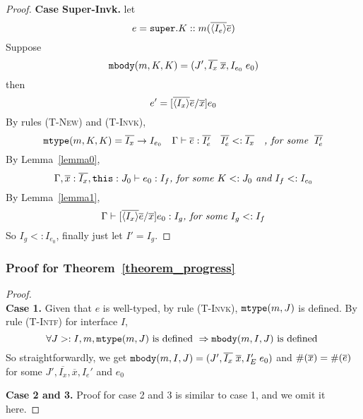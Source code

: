 \begin{proof}
\noindent \textbf{Case Super-Invk.}
let \[ e = \texttt{super}.K::m(\overline{\langle I_e \rangle} \overline{e}) \]   
Suppose \[ \texttt{mbody}(m, K, K) = (J', \overline{I_x} \; \overline{x}, I_{e_0} \; e_0) \] 
then \[ e' =  [\overline{\langle I_x \rangle} \overline{e}/\overline{x}] e_0 \] 
By rules \textsc{(T-New)} and \textsc{(T-Invk)}, 
  \[ 
     \texttt{mtype}(m, K, K) = \overline{I_x} \rightarrow I_{e_0} \quad 
     \Gamma \; {\vdash} \; \overline{e} : \overline{I_e'} \quad
     \overline{I_e'} <: \overline{I_x} \quad
     \textit{, for some } \; \overline{I_e'}
  \]
By Lemma~\ref{lemma0},
    \[
    \Gamma, \overline{x}:\overline{I_x}, \texttt{this}:J_0 \; {\vdash} \; e_0:I_f \textit{, for some } K <: J_0 \textit{ and } I_f <: I_{e_0}
    \]
By Lemma~\ref{lemma1},
    \[
    \Gamma \; {\vdash} \; [\overline{\langle I_x \rangle} \overline{e}/\overline{x} ] e_0  :  I_g \textit{, for some } I_g <: I_f 
    \]
So $I_g <: I_{e_0}$, finally just let $I' = I_g$.

\end{proof}

\subsubsection{Proof for Theorem~\ref{theorem_progress}}
\begin{proof}~\\
\noindent \textbf{Case 1.}
Given that $e$ is well-typed, by rule \textsc{(T-Invk)}, $\texttt{mtype}(m, J)$ is defined.
By rule \textsc{(T-Intf)} for interface $I$,
    \[ \forall J >: I, m, \texttt{mtype}(m, J) \text{ is defined } \Rightarrow \texttt{mbody}(m, I, J) \text{ is defined } \]
So straightforwardly, we get $ \texttt{mbody}(m, I, J) = (J', \overline{I_x} \; \overline{x}, I'_E \; e_0) $ and
         $\#(\overline{x}) = \#(\overline{e})$ for some $J', \overline{I_x}, \overline{x}, I_e'$ and $e_0$
         
\noindent \textbf{Case 2 and 3.} Proof for case 2 and 3 is similar to case 1, and we omit it here.
\end{proof}